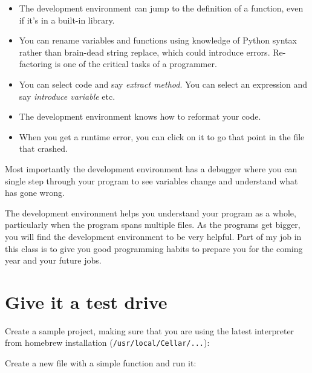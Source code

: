 \documentclass[titlepage]{tufte-book}
\begin{document}
\begin{fullwidth}
\begin{itemize}
\item The development environment can jump to the definition of a function, even if it's in a built-in library.
\item  You can rename variables and functions using knowledge of Python syntax rather than brain-dead string replace, which could introduce errors. Re-factoring is one of the critical tasks of a programmer.
\item  You can select code and say {\em extract method}. You can select an expression and say {\em introduce variable} etc. 
\item  The development environment knows how to reformat your code. 
\item  When you get a runtime error, you can click on it to go that point in the file that crashed.
\end{itemize}

Most importantly the development environment has a debugger where you can single step through your program to see variables change and understand what has gone wrong.

The development environment helps you understand your program as a whole, particularly when the program spans multiple files. As the programs get bigger, you will find the development environment to be very helpful. Part of my job in this class is to give you good programming habits to prepare you for the coming year and your future jobs.

\section{Give it a test drive}

\noindent Create a sample project, making sure that you are using the latest interpreter from homebrew installation ({\tt /usr/local/Cellar/...}):


\noindent Create a new file with a simple function and run it:


\end{fullwidth}
\end{document}
